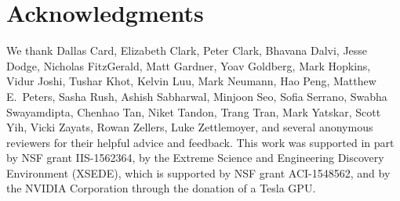 \documentclass[11pt,a4paper]{article}
\begin{document}
\section*{Acknowledgments}
We thank Dallas Card,  Elizabeth Clark,  Peter Clark,  Bhavana Dalvi,  Jesse Dodge,  Nicholas FitzGerald, Matt Gardner, Yoav Goldberg, Mark Hopkins, Vidur Joshi, Tushar Khot, Kelvin Luu, Mark Neumann,  Hao Peng,  Matthew E.~Peters,  Sasha Rush, Ashish Sabharwal,  Minjoon Seo,  Sofia Serrano, Swabha Swayamdipta,  Chenhao Tan, Niket Tandon,  Trang Tran,  Mark Yatskar,  Scott Yih,  Vicki Zayats, Rowan Zellers, Luke Zettlemoyer, and several anonymous reviewers for their helpful advice and feedback.
This work was supported in part by
NSF grant IIS-1562364, by the Extreme Science and Engineering Discovery Environment (XSEDE),
which is supported by NSF grant ACI-1548562, 
and by the NVIDIA Corporation through the donation of a Tesla GPU.








\end{document}
